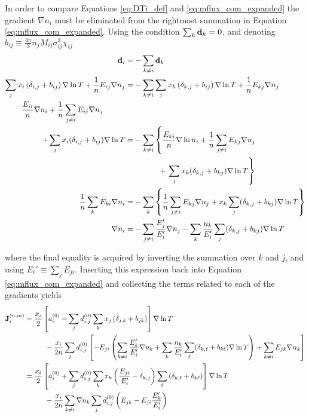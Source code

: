 In order to compare Equations \eqref{eq:DTi_def} and \eqref{eq:mflux_com_expanded} the gradient $\nabla n_i$ must be eliminated from the rightmost summation in Equation \eqref{eq:mflux_com_expanded}. Using the condition $\sum_k \boldsymbol{\mathrm{d}}_k = 0$, and denoting $b_{ij} \equiv \frac{4 \pi}{3} n_j M_{ij} \sigma_{ij}^3 \chi_{ij}$
\begin{equation}
    \begin{split}
        \boldsymbol{\mathrm{d}}_i &= - \sum_{k \neq i} \boldsymbol{\mathrm{d}}_k\\
        \sum_j x_i \left( \delta_{i,j} + b_{ij}\right) \nabla \ln T + \frac{1}{n} E_{ij} \nabla n_j &= - \sum_{k \neq i} \sum_j x_k \left( \delta_{k,j} + b_{ij}\right) \nabla \ln T + \frac{1}{n} E_{kj} \nabla n_j \\
        \frac{E_{ii}}{n} \nabla n_i + \frac{1}{n} \sum_{j \neq i} E_{ij} \nabla n_j \hspace{1cm}&\\
        + \sum_j x_i (\delta_{i, j} + b_{ij}) \nabla \ln T &= - \sum_{k \neq i} \left\{ \frac{E_{ki}}{n} \nabla \ln n_i + \frac{1}{n}\sum_{j \neq i} E_{kj} \nabla n_j \right.\\
        &\hspace{1.5cm} + \left. \sum_j x_k (\delta_{k,j} + b_{kj}) \nabla \ln T\right\} \\
        \frac{1}{n} \sum_k E_{ki} \nabla n_i &= - \sum_k \left\{ \frac{1}{n} \sum_{j \neq i} E_{kj} \nabla n_j + x_k\sum_j (\delta_{k,j} + b_{kj}) \nabla \ln T \right\} \\
        \nabla n_i &= - \sum_{j \neq i} \frac{E_j'}{E_i'} \nabla n_j - \sum_k \frac{n_k}{E_i'} \sum_j (\delta_{k,j} + b_{kj}) \nabla \ln T
    \end{split}
\end{equation}

where the final equality is acquired by inverting the summation over $k$ and $j$, and using $E_i' \equiv \sum_j E_{ji}$. Inserting this expression back into Equation \eqref{eq:mflux_com_expanded} and collecting the terms related to each of the gradients yields
\begin{equation}
    \begin{split}
        \boldsymbol{\mathrm{J}}^{(n,m)}_i &=  \frac{x_i}{2} \left[ a_i^{(0)} - \sum_j d_{i, j}^{(0)} \sum_k x_j \left( \delta_{j,k} + b_{jk}\right) \right] \nabla \ln T \\
        & \hspace{1cm} - \frac{x_i}{2n} \sum_j d_{i, j}^{(0)} \left[ - E_{ji} \left( \sum_{k \neq i} \frac{E_k'}{E_i'} \nabla n_k + \sum_k \frac{n_k}{E_i'} \sum_\ell (\delta_{k,\ell} + b_{k\ell}) \nabla \ln T \right) + \sum_{k \neq i} E_{jk} \nabla n_k \right] \\
        &= \frac{x_i}{2} \left[ a_i^{(0)} + \sum_j d_{i,j}^{(0)} \sum_k x_k \left( \frac{E_{ji}}{E_i'} - \delta_{k,j}\right)\sum_\ell \left( \delta_{k,\ell} + b_{k\ell}\right) \right] \nabla \ln T \\
        & \hspace{1cm} - \frac{x_i}{2n} \sum_{k \neq i} \nabla n_k \sum_j d_{i,j}^{(0)} \left( E_{jk} - E_{ji} \frac{E_k'}{E_i'}\right)
    \end{split}
    \label{eq:mflux_com_expanded_no_ni}
\end{equation}

